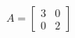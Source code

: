\documentclass[preview]{standalone}
\begin{document}
\begin{align*}
A=\begin{bmatrix}3&0\\0&2\end{bmatrix}
\end{align*}
\end{document}
